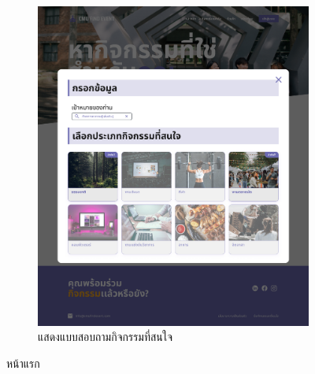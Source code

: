 \begin{figure}[h]
\begin{subfigure}[b]{0.4\linewidth}
    \includegraphics[width=\linewidth]{image/Figma-design/Main-recomendation.png}
    \caption{แสดงแบบสอบถามกิจกรรมที่สนใจ}
  \end{subfigure}
  \caption{หน้าแรก}
  \label{fig:main}
\end{figure}

